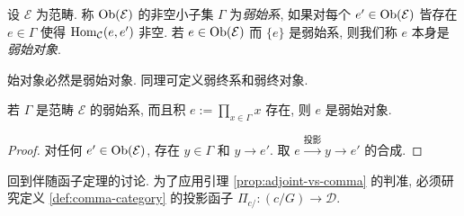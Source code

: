 \begin{definition}
	设 $\mathcal{E}$ 为范畴. 称 $\operatorname{Ob}(\mathcal{E})$ 的非空小子集 $\Gamma$ 为\emph{弱始系}, 如果对每个 $e' \in \operatorname{Ob}(\mathcal{E})$ 皆存在 $e \in \Gamma$ 使得 $\operatorname{Hom}_{\mathcal{C}}(e, e')$ 非空. 若 $e \in \operatorname{Ob}(\mathcal{E})$ 而 $\{e\}$ 是弱始系, 则我们称 $e$ 本身是\emph{弱始对象}.
\end{definition}

始对象必然是弱始对象. 同理可定义弱终系和弱终对象.

\begin{lemma}\label{prop:weakly-initial-prod}
	若 $\Gamma$ 是范畴 $\mathcal{E}$ 的弱始系, 而且积 $e := \prod_{x \in \Gamma} x$ 存在, 则 $e$ 是弱始对象.
\end{lemma}
\begin{proof}
	对任何 $e' \in \operatorname{Ob}(\mathcal{E})$, 存在 $y \in \Gamma$ 和 $y \to e'$. 取 $e \xrightarrow{\text{投影}} y \to e'$ 的合成.
\end{proof}

回到伴随函子定理的讨论. 为了应用引理 \ref{prop:adjoint-vs-comma} 的判准, 必须研究定义 \ref{def:comma-category} 的投影函子 $\Pi_{c/}: (c/G) \to \mathcal{D}$.

